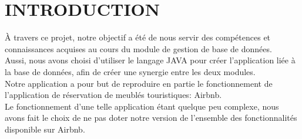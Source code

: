 \documentclass{report}
\begin{document}
\listoffigures
\tableofcontents
\chapter{INTRODUCTION}
À travers ce projet, notre objectif a été de nous servir des compétences et connaissances acquises au cours du module de gestion de base de données.\\
Aussi, nous avons choisi d'utiliser le langage JAVA pour créer l'application liée à la base de données, afin de créer une synergie entre les deux modules.\\
Notre application a pour but de reproduire en partie le fonctionnement de l'application de réservation de meublés touristiques: Airbnb.\\
Le fonctionnement d'une telle application étant quelque peu complexe, nous avons fait le choix de ne pas doter notre version de l'ensemble des fonctionnalités disponible sur Airbnb.\\
\end{document}
